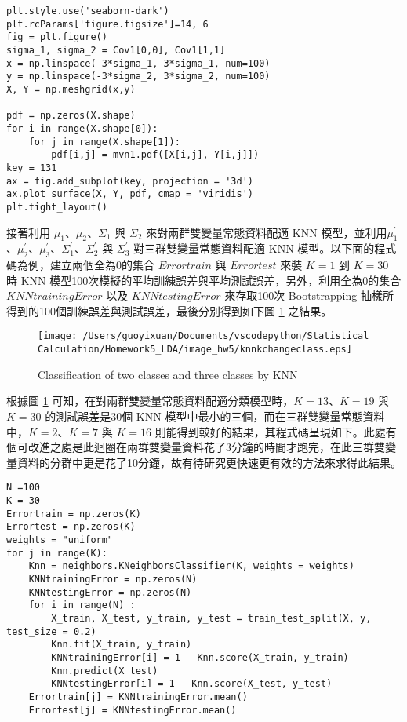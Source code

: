 \newpage

\bigskip

\begin{lstlisting}
plt.style.use('seaborn-dark')
plt.rcParams['figure.figsize']=14, 6
fig = plt.figure()
sigma_1, sigma_2 = Cov1[0,0], Cov1[1,1]
x = np.linspace(-3*sigma_1, 3*sigma_1, num=100)
y = np.linspace(-3*sigma_2, 3*sigma_2, num=100)
X, Y = np.meshgrid(x,y)

pdf = np.zeros(X.shape)
for i in range(X.shape[0]):
    for j in range(X.shape[1]):
        pdf[i,j] = mvn1.pdf([X[i,j], Y[i,j]])
key = 131
ax = fig.add_subplot(key, projection = '3d')
ax.plot_surface(X, Y, pdf, cmap = 'viridis')
plt.tight_layout()
\end{lstlisting}

接著利用 $\mu_1$、$\mu_2$、$\Sigma_1$ 與 $\Sigma_2$ 來對兩群雙變量常態資料配適 KNN 模型，並利用$\mu_1^{'}$、$\mu_2^{'}$、$\mu_3^{'}$、$\Sigma_1^{'}$、$\Sigma_2^{'}$ 與 $\Sigma_3^{'}$ 對三群雙變量常態資料配適 KNN 模型。以下面的程式碼為例，建立兩個全為0的集合 $Errortrain$ 與 $Errortest$ 來裝 $K=1$ 到 $K=30$ 時 KNN 模型100次模擬的平均訓練誤差與平均測試誤差，另外，利用全為0的集合 $KNNtrainingError$ 以及 $KNNtestingError$ 來存取100次 Bootstrapping 抽樣所得到的100個訓練誤差與測試誤差，最後分別得到如下圖 \ref{fig:knnclass} 之結果。

\begin{figure}[H]
    \centering
        \texttt{[image: /Users/guoyixuan/Documents/vscodepython/Statistical Calculation/Homework5\_LDA/image\_hw5/knnkchangeclass.eps]}
    \caption{Classification of two classes and three classes by KNN}
    \label{fig:knnclass}
\end{figure}

根據圖 \ref{fig:knnclass} 可知，在對兩群雙變量常態資料配適分類模型時，$K=13$、$K=19$ 與 $K=30$ 的測試誤差是30個 KNN 模型中最小的三個，而在三群雙變量常態資料中，$K=2$、$K=7$ 與 $K=16$ 則能得到較好的結果，其程式碼呈現如下。此處有個可改進之處是此迴圈在兩群雙變量資料花了3分鐘的時間才跑完，在此三群雙變量資料的分群中更是花了10分鐘，故有待研究更快速更有效的方法來求得此結果。

\bigskip

\begin{lstlisting}
N =100 
K = 30
Errortrain = np.zeros(K)
Errortest = np.zeros(K)
weights = "uniform"
for j in range(K):
    Knn = neighbors.KNeighborsClassifier(K, weights = weights)
    KNNtrainingError = np.zeros(N) 
    KNNtestingError = np.zeros(N) 
    for i in range(N) :
        X_train, X_test, y_train, y_test = train_test_split(X, y, test_size = 0.2)
        Knn.fit(X_train, y_train)
        KNNtrainingError[i] = 1 - Knn.score(X_train, y_train)
        Knn.predict(X_test)
        KNNtestingError[i] = 1 - Knn.score(X_test, y_test)
    Errortrain[j] = KNNtrainingError.mean()
    Errortest[j] = KNNtestingError.mean()
\end{lstlisting}

